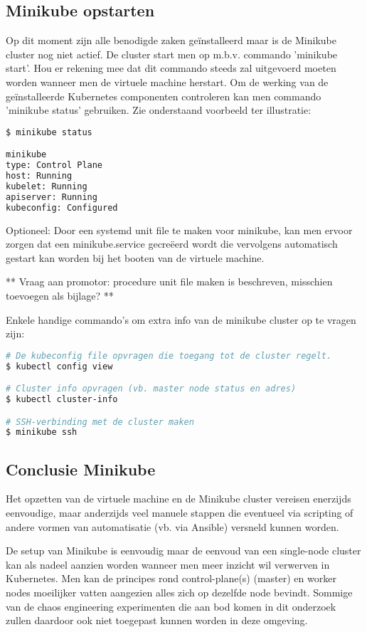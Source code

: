 \subsection{Minikube opstarten}

Op dit moment zijn alle benodigde zaken geïnstalleerd maar is de Minikube cluster nog niet actief. De cluster start men op m.b.v. commando 'minikube start'. Hou er rekening mee dat dit commando steeds zal uitgevoerd moeten worden wanneer men de virtuele machine herstart.
Om de werking van de geïnstalleerde Kubernetes componenten controleren kan men commando 'minikube status' gebruiken. Zie onderstaand voorbeeld ter illustratie: 
\begin{lstlisting}[language=bash]
$ minikube status

minikube
type: Control Plane
host: Running
kubelet: Running
apiserver: Running
kubeconfig: Configured
\end{lstlisting} 

Optioneel: Door een systemd unit file te maken voor minikube, kan men ervoor zorgen dat een minikube.service gecreëerd wordt die vervolgens automatisch gestart kan worden bij het booten van de virtuele machine. 

** Vraag aan promotor: procedure unit file maken is beschreven, misschien toevoegen als bijlage? **

Enkele handige commando's om extra info van de minikube cluster op te vragen zijn:
\begin{lstlisting}[language=bash]
# De kubeconfig file opvragen die toegang tot de cluster regelt.
$ kubectl config view 

# Cluster info opvragen (vb. master node status en adres)
$ kubectl cluster-info

# SSH-verbinding met de cluster maken
$ minikube ssh 
\end{lstlisting}

\subsection{Conclusie Minikube}

Het opzetten van de virtuele machine en de Minikube cluster vereisen enerzijds eenvoudige, maar anderzijds veel manuele stappen die eventueel via scripting of andere vormen van automatisatie (vb. via Ansible) versneld kunnen worden. 

De setup van Minikube is eenvoudig maar de eenvoud van een single-node cluster kan als nadeel aanzien worden wanneer men meer inzicht wil verwerven in Kubernetes. Men kan de principes rond control-plane(s) (master) en worker nodes moeilijker vatten aangezien alles zich op dezelfde node bevindt. 
Sommige van de chaos engineering experimenten die aan bod komen in dit onderzoek zullen daardoor ook niet toegepast kunnen worden in deze omgeving.  

